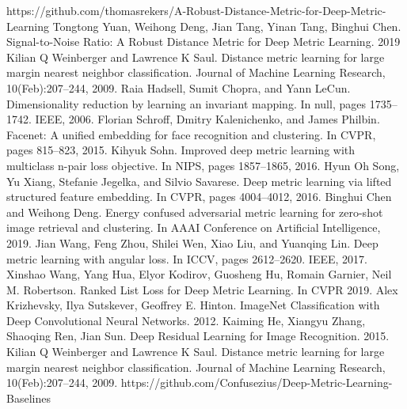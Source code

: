 \documentclass[12pt,paper=a4]{scrartcl}
\theoremstyle{break}
\begin{document}
\begin{thebibliography}{9}
https://github.com/thomasrekers/A-Robust-Distance-Metric-for-Deep-Metric-Learning
Tongtong Yuan, Weihong Deng, Jian Tang, Yinan Tang, Binghui Chen. Signal-to-Noise Ratio: A Robust Distance Metric for Deep Metric Learning. 2019
Kilian Q Weinberger and Lawrence K Saul. Distance metric
learning for large margin nearest neighbor classification.
Journal of Machine Learning Research, 10(Feb):207–244,
2009.
Raia Hadsell, Sumit Chopra, and Yann LeCun. Dimensionality
reduction by learning an invariant mapping. In null,
pages 1735–1742. IEEE, 2006.
Florian Schroff, Dmitry Kalenichenko, and James Philbin.
Facenet: A unified embedding for face recognition and clustering.
In CVPR, pages 815–823, 2015.
Kihyuk Sohn. Improved deep metric learning with multiclass
n-pair loss objective. In NIPS, pages 1857–1865, 2016.
Hyun Oh Song, Yu Xiang, Stefanie Jegelka, and Silvio
Savarese. Deep metric learning via lifted structured feature
embedding. In CVPR, pages 4004–4012, 2016.
Binghui Chen and Weihong Deng. Energy confused adversarial
metric learning for zero-shot image retrieval and clustering.
In AAAI Conference on Artificial Intelligence, 2019.
Jian Wang, Feng Zhou, Shilei Wen, Xiao Liu, and Yuanqing
Lin. Deep metric learning with angular loss. In ICCV, pages
2612–2620. IEEE, 2017.
Xinshao Wang, Yang Hua, Elyor Kodirov, Guosheng Hu, Romain Garnier, Neil M. Robertson. Ranked List Loss for Deep Metric Learning. In CVPR 2019.
Alex Krizhevsky, Ilya Sutskever, Geoffrey E. Hinton. ImageNet Classification with Deep Convolutional Neural Networks. 2012.
Kaiming He, Xiangyu Zhang, Shaoqing Ren, Jian Sun. Deep Residual Learning for Image Recognition. 2015.
Kilian Q Weinberger and Lawrence K Saul. Distance metric
learning for large margin nearest neighbor classification.
Journal of Machine Learning Research, 10(Feb):207–244,
2009.
https://github.com/Confusezius/Deep-Metric-Learning-Baselines





\end{thebibliography}
\end{document}
